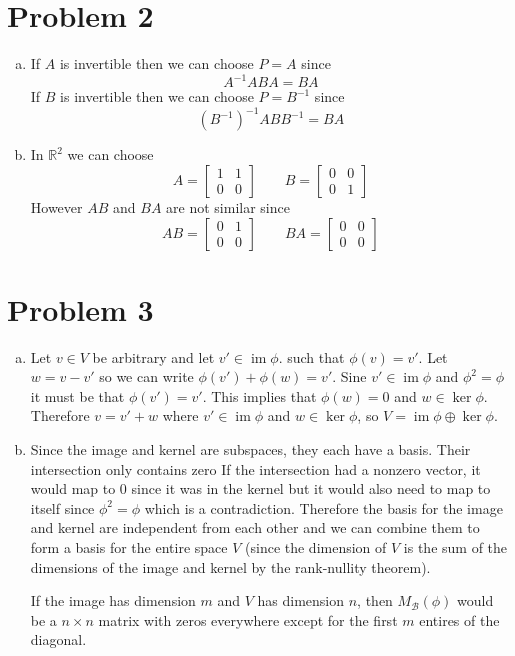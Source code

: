 \documentclass{article}
\begin{document}
\section*{Problem 2}
\begin{enumerate}[(a)]
    \item If $A$ is invertible then we can choose $P=A$ since 
    \[
        A^{-1} AB A = BA
    \]
    If $B$ is invertible then we can choose $P=B^{-1}$ since 
    \[
        (B^{-1})^{-1} AB B^{-1} = BA
    \]
    \item In $\mathbb{R}^2$ we can choose 
    \[ 
        A = \begin{bmatrix}
            1 & 1 \\ 
            0 & 0
        \end{bmatrix}
        \qquad
        B = \begin{bmatrix}
            0 & 0 \\ 
            0 & 1
        \end{bmatrix}
    \]
    However $AB$ and $BA$ are not similar since
    \[
        AB = \begin{bmatrix}
            0 & 1 \\ 
            0 & 0
        \end{bmatrix}
        \qquad 
        BA = \begin{bmatrix}
            0 & 0 \\ 
            0 & 0
        \end{bmatrix}
    \]
\end{enumerate}
\newpage 

\section*{Problem 3}
\begin{enumerate}[(a)]
   \item Let $v \in V$ be arbitrary and let $v' \in \operatorname{im} \phi$. 
   such that $\phi(v) = v'$.
   Let $w = v-v'$ so we can write $\phi(v') + \phi(w) = v'$.
   Sine $v' \in \operatorname{im} \phi$ and $\phi^2 = \phi$
   it must be that $\phi(v') = v'$.
   This implies that $\phi(w) = 0$ and $w \in \operatorname{ker} \phi$.
   Therefore $v = v' + w$ where $v' \in \operatorname{im} \phi$ and 
   $w \in \operatorname{ker} \phi$, so $V = \operatorname{im}\phi \oplus \operatorname{ker}\phi$.
   \item Since the image and kernel are subspaces, they each have a basis.
   Their intersection only contains zero 
   If the intersection had a nonzero vector, 
   it would map to $0$ since it was in the kernel but it would also need to map to itself
   since $\phi^2 = \phi$ which is a contradiction.
   Therefore the basis for the image and kernel are independent from each other and we 
   can combine them to form a basis for the entire space $V$
   (since the dimension of $V$ is the sum of the dimensions of the image and kernel by the rank-nullity theorem).

   If the image has dimension $m$ and $V$ has dimension $n$,
   then $M_\mathcal{B}(\phi)$ would be a $n\times n$ matrix with zeros everywhere
   except for the first $m$ entires of the diagonal. 
\end{enumerate}
\newpage
\end{document}
